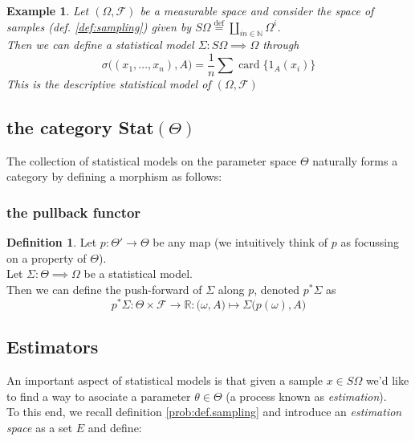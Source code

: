 \documentclass{book}
\theoremstyle{plain}
\newtheorem{example}[corollary]{Example}
\theoremstyle{definition}
\newtheorem{definition}[corollary]{Definition}
\DeclareMathOperator{\card}{card}
\renewcommand{\d}[1]{\mathbb{#1}}
\newcommand{\define}{\stackrel{\operatorname{def}}{=}}
\newcommand{\fun}{\mapsto}
\newcommand{\mor}{\longrightarrow}
\renewcommand{\r}[1]{\mathcal{#1}}
\renewcommand{\r}[1]{\mathcal{#1}}
\begin{document}
\begin{example}
Let $(\Omega, \r{F})$ be a measurable space and consider the  space  of samples (def. \ref{def:sampling}) given by $S\Omega\define \coprod_{in \in\d{N}}\Omega^i$.\\
Then we can define a statistical model $\Sigma: S\Omega \implies \Omega$ through
\[
\sigma\big((x_1,\ldots, x_n), A\big)=\frac{1}{n}\sum \card\big\{1_{A}(x_i)\big\}
\]
This is the descriptive statistical model of $(\Omega, \r{F})$\end{example}
\subsection{the category Stat$(\Theta)$}
The collection of statistical models on  the parameter space $\Theta$ naturally forms a category by defining a morphism as follows:



\subsubsection{the pullback functor}

\begin{definition}
Let $p:\Theta'\mor \Theta$ be any map (we intuitively think of $p$ as focussing on a  property of $\Theta$).\\
Let $\Sigma: \Theta\implies \Omega$ be a statistical model.\\
Then we can define the push-forward of $\Sigma$ along $p$, denoted $p^*\Sigma$ as 
\[
p^*\Sigma: \Theta\times \r{F}\mor \d{R}: \big(\omega,A)\fun \Sigma\big(p(\omega), A\big)
\]
\end{definition}



\subsection{Estimators}

\noindent An important aspect of statistical models is that given a sample $x \in S\Omega$ we'd like to find a way to asociate a parameter $\theta \in \Theta$ (a process known as \emph{estimation}).\\
To this end, we  recall definition \ref{prob:def.sampling} and introduce an \emph{estimation space} as a set $E$ and define:
\end{document}
